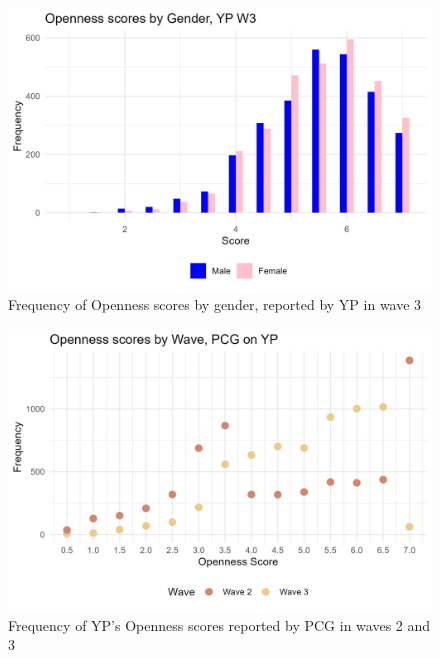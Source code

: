 \documentclass[a4paper]{article}
\begin{document}
\begin{figure}[htbp] 
    \centering
    \includegraphics[width=1\linewidth]{Frequency of Openness by Gender side by side.jpeg}
    \caption{Frequency of Openness scores by gender, reported by YP in wave 3}
    \label{}
\end{figure}

\begin{figure}[htbp] 
    \centering
    \includegraphics[width=1\linewidth]{Frequency of Openness by Wave, PCG.jpeg}
    \caption{Frequency of YP's Openness scores reported by PCG in waves 2 and 3}
    \label{}
\end{figure}
\end{document}
